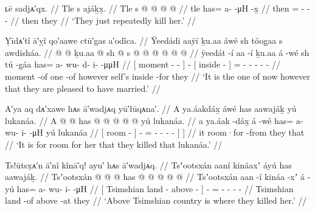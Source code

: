 \ex\label{ex:89-54-repeatedly-kill}%
%
\begingl
	\glpreamble	ʟē sadjᴀ′qx. //
	\glpreamble	Tle s ajáḵx̱. //
	\gla	Tle s @  @ {} @ {} @ {} //
	\glb	tle has= a-  -μH -x̱ //
	\glc	then = -  - - //
	\gld	then they  {} {} {} //
	\glft	‘They just repeatedly kill her.’
		//
\endgl
\xe

\ex\label{ex:89-55-pleased-to-marry}%
%
\begingl
	\glpreamble	Ỵīdᴀ′tî ā′ỵî qo′aawe ctū′gas a′odîca. //
	\glpreamble	Ÿeedádi aaÿí ḵu.aa áwé sh tóog̱aa s awdisháa. //
	\gla	{}  @ {}  @ {} {}
		ḵu.aa  @ {}
		{} sh  @ {} {}
		s @  @ {} @ {} @ {} @ {} @ {} //
	\glb	{} ÿeedát -í aa -í {}
		ḵu.aa á -wé
		{} sh tú -g̱áa {}
		has= a- wu- d- i-  -μμH //
	\glc	{}[ moment -  - {}]
		  -
		{}[  inside - {}]
		= - - - -  - //
	\gld	{} moment -of one -of {}
		however  {}
		{} self’s inside -for {}
		they  {} {} {} {} {} //
	\glft	‘It is the one of now however that they are pleased to have married.’
		//
\endgl
\xe

\ex\label{ex:89-56-killed-lukanaa}%
%
\begingl
	\glpreamble	A′ya aq dᴀ′xawe hᴀs ā′wadjᴀq yū′łūqᴀna′. //
	\glpreamble	A ya.áakdáx̱ áwé has aawajáḵ yú lukanáa. //
	\gla	{} A  @ {} {}
		 @ {}
		has @  @ {} @ {} @ {} @ {}
		{} yú lukanáa. {} //
	\glb	{} a ya.áak -dáx̱ {}
		á -wé
		has= a- wu- i-  -μH
		{} yú lukanáa {} //
	\glc	{}[  room - {}]
		 -
		= - - -  -
		{}[   {}] //
	\gld	{} it room·for -from {}
		 {}
		they  {} {} {} {} 
		{} that  {} //
	\glft	‘It is for room for her that they killed that lukanáa.’
		//
\endgl
\xe

\ex\label{ex:89-57-above-Tsimshian-land}%
%
\begingl
	\glpreamble	Ts!ūtsx̣ᴀ′n ā′nî kînā′q! ayu′ hᴀs ā′wadjᴀq. //
	\glpreamble	Tsʼootsxán aaní kináaxʼ áyú has aawajáḵ. //
	\gla	{} Tsʼootsxán  @ {}  @ {} {}
		 @ {}
		has @  @ {} @ {} @ {} @ {} //
	\glb	{} Tsʼootsxán aan -í kináa -xʼ {}
		á -yú
		has= a- wu- i-  -μH //
	\glc	{}[ Tsimshian land - above - {}]
		 -
		= - - -  - //
	\gld	{} Tsimshian land -of above -at {}
		 {}
		they  {} {} {} {} //
	\glft	‘Above Tsimshian country is where they killed her.’
		//
\endgl
\xe

